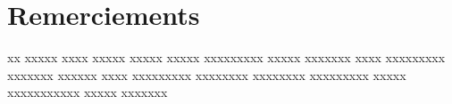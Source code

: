 \chapter*{Remerciements}
{}
\adjustmtc
\thispagestyle{MyStyle}

\begin{center}
xx xxxxx xxxx xxxxx xxxxx xxxxx xxxxxxxxx xxxxx xxxxxxx xxxx xxxxxxxxx xxxxxxx xxxxxx xxxx xxxxxxxxx xxxxxxxx xxxxxxxx xxxxxxxxx xxxxx xxxxxxxxxxx xxxxx xxxxxxx 
\end{center}